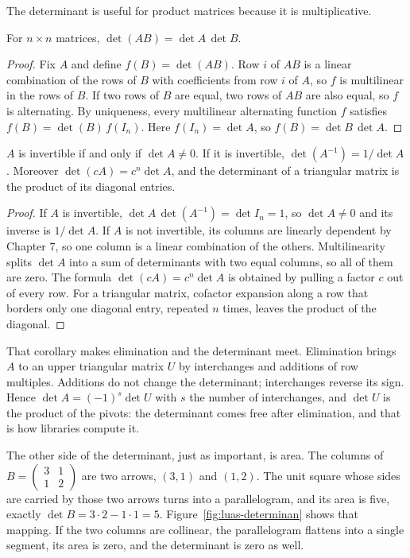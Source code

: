 The determinant is useful for product matrices because it is multiplicative.

\begin{teorema}
For $n\times n$ matrices, $\det(AB)=\det A\,\det B$.
\end{teorema}

\begin{proof}
Fix $A$ and define $f(B)=\det(AB)$. Row $i$ of $AB$ is a linear combination of the rows of $B$
with coefficients from row $i$ of $A$, so $f$ is multilinear in the rows of $B$. If two rows of
$B$ are equal, two rows of $AB$ are also equal, so $f$ is alternating. By uniqueness, every
multilinear alternating function $f$ satisfies $f(B)=\det(B)\,f(I_{n})$. Here $f(I_{n})=\det A$,
so $f(B)=\det B\,\det A$.
\end{proof}

\begin{akibat}
$A$ is invertible if and only if $\det A\neq0$. If it is invertible, $\det(A^{-1})=1/\det A$.
Moreover $\det(cA)=c^{n}\det A$, and the determinant of a triangular matrix is the product of
its diagonal entries.
\end{akibat}

\begin{proof}
If $A$ is invertible, $\det A\,\det(A^{-1})=\det I_{n}=1$, so $\det A\neq0$ and its inverse is
$1/\det A$. If $A$ is not invertible, its columns are linearly dependent by Chapter 7, so one
column is a linear combination of the others. Multilinearity splits $\det A$ into a sum of
determinants with two equal columns, so all of them are zero. The formula $\det(cA)=c^{n}\det A$
is obtained by pulling a factor $c$ out of every row. For a triangular matrix, cofactor
expansion along a row that borders only one diagonal entry, repeated $n$ times, leaves the
product of the diagonal.
\end{proof}

That corollary makes elimination and the determinant meet. Elimination brings $A$ to an upper
triangular matrix $U$ by interchanges and additions of row multiples. Additions do not change
the determinant; interchanges reverse its sign. Hence $\det A=(-1)^{s}\det U$ with $s$ the
number of interchanges, and $\det U$ is the product of the pivots: the determinant comes free
after elimination, and that is how libraries compute it.

The other side of the determinant, just as important, is area. The columns of
$B=\begin{pmatrix}3&1\\ 1&2\end{pmatrix}$ are two arrows, $(3,1)$ and $(1,2)$. The unit square
whose sides are carried by those two arrows turns into a parallelogram, and its area is five,
exactly $\det B=3\cdot2-1\cdot1=5$. Figure~\ref{fig:luas-determinan} shows that mapping. If the
two columns are collinear, the parallelogram flattens into a single segment, its area is zero,
and the determinant is zero as well.


